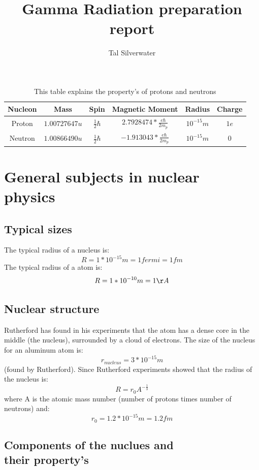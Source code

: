\documentclass[]{article}
\title{Gamma Radiation preparation report}
\author{Tal Silverwater}
\date{}
\begin{document}
\maketitle


\begin{table}[!b]
	\centering
	\begin{tabular}{||c | c c c c c||} 
		\hline
		Nucleon & Mass & Spin & Magnetic Moment & Radius & Charge \\ [0.5ex] 
		\hline
		Proton & $1.00727647 u$ & $\frac{1}{2}\hbar$ & $2.7928474*\frac{e\hbar}{2m_p}$ & $10^{-15}m$ & $1e$ \\ 
		\hline
		Neutron & $1.00866490 u$ & $\frac{1}{2}\hbar$ & $-1.913043*\frac{e\hbar}{2m_p}$ & $10^{-15}m$ & 0  \\
		\hline
		
	\end{tabular}
	\caption{This table explains the property's of protons and neutrons}
\end{table}

\section{General subjects in nuclear \\ physics}
\subsection{Typical sizes}

The typical radius of a nucleus is: $$R=1*10^{-15}m=1fermi=1fm$$
The typical radius of a atom is: $$R=1*10^{-10}m=1\AA$$

\subsection{Nuclear structure}

Rutherford has found in his experiments that the atom has a dense core in the middle (the nucleus), surrounded by a cloud of electrons.
The size of the nucleus for an aluminum atom is: $$r_{nucleus}=3*10^{-15}m$$ (found by Rutherford).
Since Rutherford experiments showed that the radius of the nucleus is: $$R=r_{0}A^{-\frac{1}{3}}$$ where A is the atomic mass number (number of protons times number of neutrons) and: $$r_0=1.2*10^{-15}m=1.2fm$$

\subsection{Components of the nuclues and \\ their property's}
\end{document}

